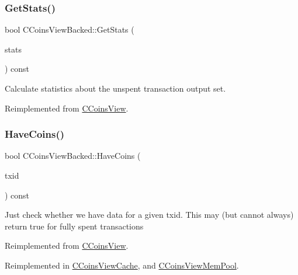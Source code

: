 \subsubsection{\texorpdfstring{Get\+Stats()}{GetStats()}}
{\footnotesize\ttfamily bool C\+Coins\+View\+Backed\+::\+Get\+Stats (\begin{DoxyParamCaption}\item[{\mbox{\hyperlink{struct_c_coins_stats}{C\+Coins\+Stats}} \&}]{stats }\end{DoxyParamCaption}) const\hspace{0.3cm}{\ttfamily [virtual]}}



Calculate statistics about the unspent transaction output set. 



Reimplemented from \mbox{\hyperlink{class_c_coins_view_adbd7f73ba071c6e441dd88d95b8f2c0d}{C\+Coins\+View}}.

\mbox{\label{class_c_coins_view_backed_ad49041658bdec807d556e080476e6543}} 
\subsubsection{\texorpdfstring{Have\+Coins()}{HaveCoins()}}
{\footnotesize\ttfamily bool C\+Coins\+View\+Backed\+::\+Have\+Coins (\begin{DoxyParamCaption}\item[{const \mbox{\hyperlink{classuint256}{uint256}} \&}]{txid }\end{DoxyParamCaption}) const\hspace{0.3cm}{\ttfamily [virtual]}}

Just check whether we have data for a given txid. This may (but cannot always) return true for fully spent transactions 

Reimplemented from \mbox{\hyperlink{class_c_coins_view_ade3a65fc3f1b02baf7bebce630e4eba3}{C\+Coins\+View}}.



Reimplemented in \mbox{\hyperlink{class_c_coins_view_cache_aa8f0c55b6fc207d2188948a565125ab7}{C\+Coins\+View\+Cache}}, and \mbox{\hyperlink{class_c_coins_view_mem_pool_a2c5900448dc5570053060686ad1f014b}{C\+Coins\+View\+Mem\+Pool}}.

\mbox{\label{class_c_coins_view_backed_a7eaddfbfd401a95c2fda2a8d8feaaf73}} 
